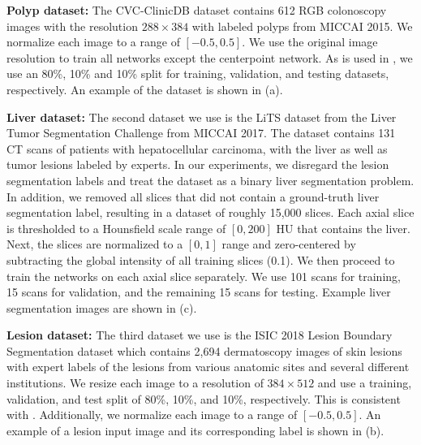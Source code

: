 \textbf{Polyp dataset:} The CVC-ClinicDB dataset
\cite{bernalWMDOVAMapsAccurate2015} contains 612 RGB 
colonoscopy images with the resolution $288 \times 384$ 
with labeled polyps from MICCAI 2015. We normalize each image to a range of $[-0.5, 0.5]$. 
We use the original image resolution to train all networks except the 
centerpoint network. As is used in \cite{jhaDoubleUNetDeepConvolutional2020}, 
we use an 80\%, 10\% and 10\% 
split for training, validation, and testing datasets, respectively. An example of the dataset is shown in (a).

\textbf{Liver dataset:} The second dataset we use is the LiTS dataset \cite{bilicLiverTumorSegmentation2019} from the Liver Tumor Segmentation Challenge from MICCAI 2017. The dataset contains 131 CT scans of patients with hepatocellular carcinoma, with the liver as well as tumor lesions labeled by experts. In our experiments, we disregard the lesion segmentation labels and treat the dataset as a binary liver segmentation problem. In addition, we removed all slices that did not contain a ground-truth liver segmentation label, resulting in a dataset of roughly 15,000 slices. Each axial slice is thresholded to a Hounsfield scale range of $[0, 200]$ HU that contains the liver. Next, the slices are normalized to a $[0, 1]$ range and zero-centered by subtracting the global intensity of all training slices (0.1). We then proceed to train the networks on each axial slice separately. We use 101 scans for training, 15 scans for validation, and the remaining 15 scans for testing. Example liver segmentation images are shown in (c).

\textbf{Lesion dataset:} The third dataset we use is the ISIC 2018 Lesion Boundary Segmentation dataset 
\cite{codellaSkinLesionAnalysis2018, tschandlHAM10000DatasetLarge2018} which contains 2,694 dermatoscopy 
images of skin lesions with expert labels of the lesions from various anatomic sites and several different 
institutions. We resize each image to a 
resolution of $384 \times 512$ and use a training, validation, and test split of 80\%, 10\%, and 10\%, 
respectively. This is consistent with \cite{jhaDoubleUNetDeepConvolutional2020}. Additionally, we normalize 
each image to a range of $[-0.5, 0.5]$. An example of a lesion 
input image and its corresponding label is shown in (b).

